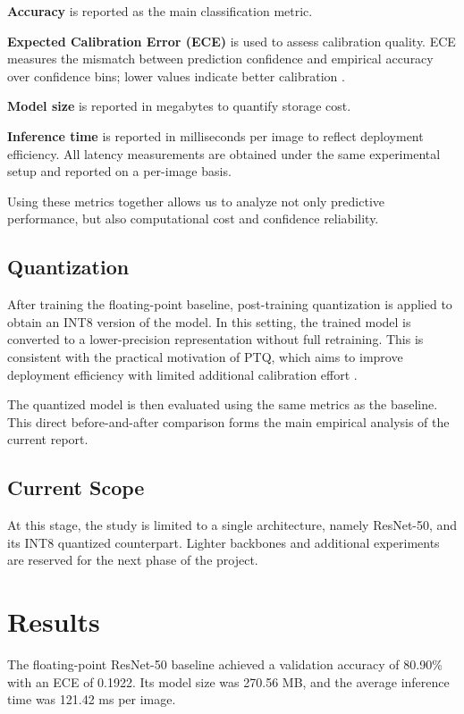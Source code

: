 \documentclass{article} %
\begin{document}
\textbf{Accuracy} is reported as the main classification metric.

\textbf{Expected Calibration Error (ECE)} is used to assess calibration quality. ECE measures the mismatch between prediction confidence and empirical accuracy over confidence bins; lower values indicate better calibration \citep{guo2017calibration}.

\textbf{Model size} is reported in megabytes to quantify storage cost.

\textbf{Inference time} is reported in milliseconds per image to reflect deployment efficiency. All latency measurements are obtained under the same experimental setup and reported on a per-image basis.

Using these metrics together allows us to analyze not only predictive performance, but also computational cost and confidence reliability.

\subsection{Quantization}

After training the floating-point baseline, post-training quantization is applied to obtain an INT8 version of the model. In this setting, the trained model is converted to a lower-precision representation without full retraining. This is consistent with the practical motivation of PTQ, which aims to improve deployment efficiency with limited additional calibration effort \citep{hubara2021ptq}.

The quantized model is then evaluated using the same metrics as the baseline. This direct before-and-after comparison forms the main empirical analysis of the current report.

\subsection{Current Scope}

At this stage, the study is limited to a single architecture, namely ResNet-50, and its INT8 quantized counterpart. Lighter backbones and additional experiments are reserved for the next phase of the project.

\section{Results}

The floating-point ResNet-50 baseline achieved a validation accuracy of 80.90\% with an ECE of 0.1922. Its model size was 270.56 MB, and the average inference time was 121.42 ms per image.
\end{document}
